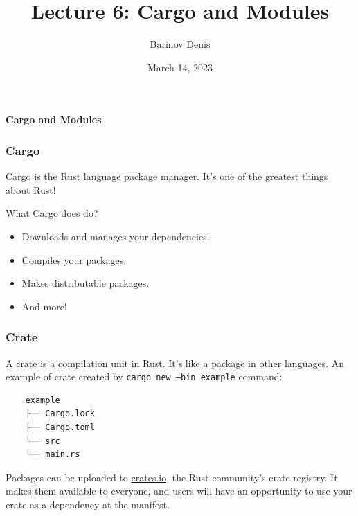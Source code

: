 \documentclass[aspectratio=1610,t]{beamer}
\title{Lecture 6: Cargo and Modules}
\date{March 14, 2023}
\author{Barinov Denis}
\institute{barinov.diu@gmail.com}
\begin{document}

\begin{frame}
\maketitle
\end{frame}


\begin{frame}[c]
\centering\Huge\textbf{Cargo and Modules}
\end{frame}


\begin{frame}[fragile]
\frametitle{Cargo}
Cargo is the Rust language package manager. It's one of the greatest things about Rust!

What Cargo does do?

\begin{itemize}
    \item Downloads and manages your dependencies.
    \item Compiles your packages.
    \item Makes distributable packages.
    \item And more!
\end{itemize}
\end{frame}


\begin{frame}[fragile]
\frametitle{Crate}
A crate is a compilation unit in Rust. It's like a package in other languages. An example of crate created by \texttt{cargo new --bin example} command:

\begin{verbatim}
    example
    ├── Cargo.lock
    ├── Cargo.toml
    └── src
    └── main.rs
\end{verbatim}

Packages can be uploaded to \href{https://crates.io}{crates.io}, the Rust community's crate registry. It makes them available to everyone, and users will have an opportunity to use your crate as a dependency at the manifest.
\end{frame}

\end{document}
